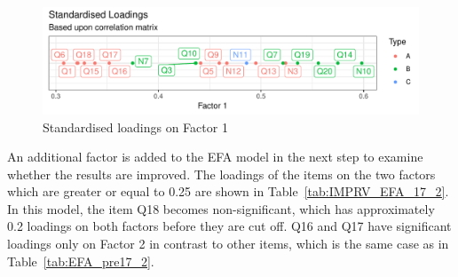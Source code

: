 \documentclass[a4paper]{report}
\begin{document}
\begin{figure}[H]
  \centering
  \includegraphics[width=\linewidth]{fig/IMPRV_EFA_17_1.pdf}
  \caption{\label{fig:IMPRV_EFA_17_1}Standardised loadings on Factor 1}
\end{figure}

An additional factor is added to the EFA model in the next step to examine whether the results are improved. The loadings of the items on the two factors which are greater or equal to 0.25 are shown in Table~\ref{tab:IMPRV_EFA_17_2}. In this model, the item Q18 becomes non-significant, which has approximately 0.2 loadings on both factors before they are cut off. Q16 and Q17 have significant loadings only on Factor 2 in contrast to other items, which is the same case as in Table~\ref{tab:EFA_pre17_2}. 
\end{document}
